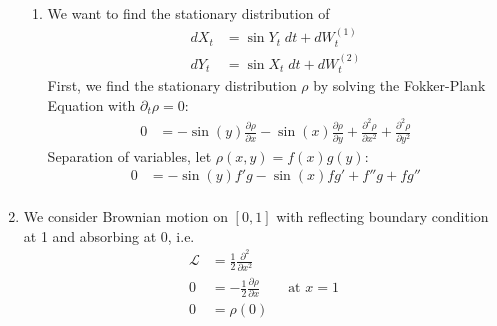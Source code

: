 \documentclass[12pt]{article}
\theoremstyle{plain}
\theoremstyle{definition}
\theoremstyle{remark}
\begin{document}
\begin{enumerate}
\begin{enumerate}
      \item %
        We want to find the stationary distribution of
        \begin{align*}
          dX_t &= \sin Y_t \; dt + dW_t^{(1)} \\
          dY_t &= \sin X_t \; dt + dW_t^{(2)}
        \end{align*}
        First, we find the stationary distribution $\rho$ by solving the
        Fokker-Plank Equation with $\partial_t \rho=0$:
        \begin{align*}
          0 &=
          - \sin(y) \frac{\partial \rho}{\partial x}
          - \sin(x) \frac{\partial \rho}{\partial y}
          + \frac{\partial^2 \rho}{\partial x^2}
          + \frac{\partial^2 \rho}{\partial y^2}
        \end{align*}
        Separation of variables, let $\rho(x,y) = f(x) g(y)$:
        \begin{align*}
          0 &=
          - \sin(y) f' g
          - \sin(x) f g'
          + f'' g
          + f g''\\
        \end{align*}

    \end{enumerate}

  \item %
    We consider Brownian motion on $[0,1]$ with reflecting boundary
    condition at 1 and absorbing at 0, i.e.
    \begin{align*}
      \mathscr{L} &= \frac{1}{2} \frac{\partial^2}{\partial x^2}\\
      0 &= -\frac{1}{2} \frac{\partial \rho}{\partial x} \qquad \text{at $x=1$}\\
      0 &= \rho(0)
    \end{align*}


\end{enumerate}
\end{document}
